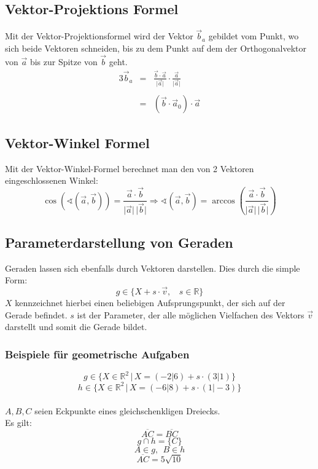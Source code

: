 \documentclass[12pt,a4paper]{scrbook}
\begin{document}
\subsection{Vektor-Projektions Formel}
Mit der Vektor-Projektionsformel wird der Vektor $\vec{b}_a$ gebildet vom Punkt, wo sich beide Vektoren
schneiden, bis zu dem Punkt auf dem der Orthogonalvektor von $\vec{a}$ bis zur Spitze von $\vec{b}$ geht. 
\begin{alignat}{3}
\vec{b}_a & = & \frac{\vec{b} \cdot \vec{a}}{\vert \vec{a} \vert} \cdot \frac{\vec{a}}{\vert \vec{a} \vert}\nonumber \\\nonumber\\
 & = & (\vec{b} \cdot \vec{a}_0) \cdot \vec{a} \nonumber 
\end{alignat}

\subsection{Vektor-Winkel Formel}
Mit der Vektor-Winkel-Formel berechnet man den von 2 Vektoren eingeschlossenen Winkel:
\[ \cos(\sphericalangle(\vec{a}, \vec{b})) = \frac{\vec{a} \cdot \vec{b}}{\vert \vec{a} \vert \, \vert \vec{b} \vert} \Longrightarrow \sphericalangle(\vec{a}, \vec{b}) = \arccos\left(\frac{\vec{a} \cdot \vec{b}}{\vert \vec{a} \vert \, \vert \vec{b} \vert} \right) \] 


\subsection{Parameterdarstellung von Geraden}
Geraden lassen sich ebenfalls durch Vektoren darstellen. Dies durch die simple Form:
\[ g \in \{X + s \cdot \vec{v}, ~~~~ s \in \mathbb{R}\} \]
$X$ kennzeichnet hierbei einen beliebigen Aufsprungspunkt, der sich auf der Gerade befindet. $s$ ist der Parameter,
der alle möglichen Vielfachen des Vektors $\vec{v}$ darstellt und somit die Gerade bildet.

\subsubsection{Beispiele für geometrische Aufgaben}
\[ g \in \{X \in \mathbb{R}^2 \, \vert \, X = (-2 \vert 6) + s \cdot (3 \vert 1)\} \]
\[ h \in \{X \in \mathbb{R}^2 \, \vert \, X = (-6 \vert 8) + s \cdot (1 \vert -3)\} \]\\

$A, B, C$ seien Eckpunkte eines gleichschenkligen Dreiecks.\\
Es gilt:\\
\[ \overline{AC} = \overline{BC} \]
\[ g \cap h = \{C\} \]
\[ A \in g, ~~ B \in h \]
\[ \overline{AC} = 5 \sqrt{10} \]\\
\end{document}
